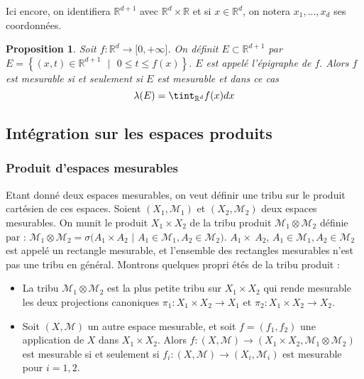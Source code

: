 \documentclass[3pt]{article}
\newtheorem{proposition}[theorem]{Proposition}
\begin{document}
\bigskip

Ici encore, on identifiera $\mathbb{R}^{d+1}$ avec $\mathbb{R}^{d}\times 
\mathbb{R}$ et si $x\in \mathbb{R}^{d}$, on notera $x_{1},...,x_{d}$ ses
coordonn\'{e}es.

\bigskip

\begin{proposition}
Soit $f:\mathbb{R}^{d}\rightarrow \lbrack 0,+\infty ]$. On d\'{e}finit $%
E\subset \mathbb{R}^{d+1}$ par $E=\left\{ (x,t)\in \mathbb{R}^{d+1}\text{ }|%
\text{ }0\leq t\leq f(x)\right\} .$ $E$ est appel\'{e} l'\'{e}pigraphe de $%
f. $ Alors $f$ est mesurable si et seulement si $E$ est mesurable et dans ce
cas 
\begin{equation*}
\lambda (E)=\tint_{\mathbb{R}^{d}}f(x)dx
\end{equation*}
\end{proposition}

\bigskip

\subsection{Int\'{e}gration sur les espaces produits}

\bigskip

\subsubsection{Produit d'espaces mesurables}

Etant donn\'{e} deux espaces mesurables, on veut d\'{e}finir une tribu sur
le produit cart\'{e}sien de ces espaces. Soient $(X_{1},\mathcal{M}_{1})$ et 
$(X_{2},\mathcal{M}_{2})$ deux espaces mesurables. On munit le produit $%
X_{1}\times X_{2}$ de la tribu produit $\mathcal{M}_{1}\otimes \mathcal{M}%
_{2}$ d\'{e}finie par : $\mathcal{M}_{1}\otimes \mathcal{M}_{2}=\sigma
(A_{1}\times A_{2}$ $|$ $A_{1}\in \mathcal{M}_{1},A_{2}\in \mathcal{M}_{2}).$
$A_{1}\times \ A_{2}$, $A_{1}\in \mathcal{M}_{1},A_{2}\in \mathcal{M}_{2}$
est appel\'{e} un rectangle mesurable, et l'ensemble des rectangles
mesurables n'est pas une tribu en g\'{e}n\'{e}ral. Montrons quelques propri%
\'{e}t\'{e}s de la tribu produit :

\begin{itemize}
\item La tribu $\mathcal{M}_{1}\otimes \mathcal{M}_{2}$ est la plus petite
tribu sur $X_{1}\times X_{2}$ qui rende mesurable les deux projections
canoniques $\pi _{1}:X_{1}\times X_{2}\rightarrow X_{1}$ et $\pi
_{2}:X_{1}\times X_{2}\rightarrow X_{2}$.

\item Soit $(X,\mathcal{M})$ un autre espace mesurable, et soit $%
f=(f_{1},f_{2})$ une application de $X$ dans $X_{1}\times X_{2}$. Alors $%
f:(X,\mathcal{M})\rightarrow (X_{1}\times X_{2},\mathcal{M}_{1}\otimes 
\mathcal{M}_{2})$ est mesurable si et seulement si $f_{i}:(X,\mathcal{M}%
)\rightarrow (X_{i},\mathcal{M}_{i})$ est mesurable pour $i=1,2$.
\end{itemize}
\end{document}
